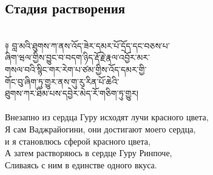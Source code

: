 \subsection{Стадия растворения}
\\
\ti
༈ བླ་མའི་ཐུགས་ཀ་ནས་འོད་ཟེར་དམར་པོ་དྲོད་དང་བཅས་པ་\\
ཞིག་ཝལ་གྱིས་བྱུང་བ་བདག་ཉིད་རྡོ་རྗེ་རྣལ་འབྱོར་མར་\\
གསལ་བའི་སྙིང་གར་རེག་པ་ཙམ་གྱིས་འོད་དམར་གྱི་\\
གོང་བུ་ཞིག་ཏུ་གྱུར་ནས་གུ་རུ་རིན་པོ་ཆེའི་\\
ཐུགས་ཀར་ཐིམ་པས་དབྱེར་མེད་རོ་གཅིག་ཏུ་གྱུར།\\
\\
\ru
Внезапно из сердца Гуру исходят лучи красного цвета,\\
Я сам Ваджрайогини, они достигают моего сердца,\\
и я становлюсь сферой красного цвета,\\
А затем растворяюсь в сердце Гуру Ринпоче,\\
Сливаясь с ним в единстве одного вкуса.\\
